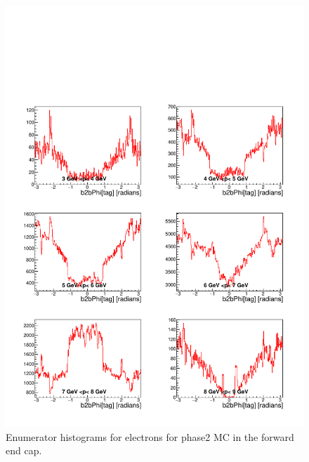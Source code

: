 \documentclass[a4paper,11pt,twosided,final,german,openbib,pdftex,listof=totoc,bibliography=totoc]{scrbook}
\begin{document}
\begin{appendix}
\begin{figure}[!htbp]
	\centering
	\includegraphics[width=\textwidth]{Plots/master/xPMPhiemFCE_MC}
	\caption[Momentum $\phi$ Electron Forward End Cap Enumerator Histogram Phase2 MC]{Enumerator histograms for electrons for phase2 MC in the forward end cap.}
	\label{plt:PMPhiemFCE_MC}
\end{figure}


\end{appendix}
\end{document}

